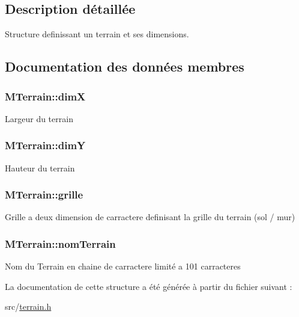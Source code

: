 \subsection{Description détaillée}
Structure definissant un terrain et ses dimensions. 

\subsection{Documentation des données membres}
\subsubsection[{\texorpdfstring{dimX}{dimX}}]{\setlength{\rightskip}{0pt plus 5cm}M\+Terrain\+::dimX}\hypertarget{structMTerrain_ae6f66d485448ae93c427e0586d6b12aa}{}\label{structMTerrain_ae6f66d485448ae93c427e0586d6b12aa}
Largeur du terrain 
\subsubsection[{\texorpdfstring{dimY}{dimY}}]{\setlength{\rightskip}{0pt plus 5cm}M\+Terrain\+::dimY}\hypertarget{structMTerrain_a638d309791fdf84d0267d75702bbab50}{}\label{structMTerrain_a638d309791fdf84d0267d75702bbab50}
Hauteur du terrain 
\subsubsection[{\texorpdfstring{grille}{grille}}]{\setlength{\rightskip}{0pt plus 5cm}M\+Terrain\+::grille}\hypertarget{structMTerrain_a392b4ed453bab400087d0bda7d452877}{}\label{structMTerrain_a392b4ed453bab400087d0bda7d452877}
Grille a deux dimension de carractere definisant la grille du terrain (sol / mur) 
\subsubsection[{\texorpdfstring{nom\+Terrain}{nomTerrain}}]{\setlength{\rightskip}{0pt plus 5cm}M\+Terrain\+::nom\+Terrain}\hypertarget{structMTerrain_a948d5d38016eed56187a94028e34f5e4}{}\label{structMTerrain_a948d5d38016eed56187a94028e34f5e4}
Nom du Terrain en chaine de carractere limité a 101 carracteres 

La documentation de cette structure a été générée à partir du fichier suivant \+:\begin{DoxyCompactItemize}
\item 
src/\hyperlink{terrain_8h}{terrain.\+h}\end{DoxyCompactItemize}
